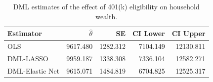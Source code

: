 \begin{table}[!htbp]
\centering
\caption{DML estimates of the effect of 401(k) eligibility on household wealth.}
\label{tab:dml-results}
\renewcommand{\arraystretch}{1.12}
\begin{tabular}{lrrrr}
 \hline
Estimator & $\hat{\theta}$ & SE & CI Lower & CI Upper \\
 \hline
OLS & 9617.480 & 1282.312 & 7104.149 & 12130.811 \\
DML-LASSO & 9959.187 & 1338.308 & 7336.104 & 12582.271 \\
DML-Elastic Net & 9615.071 & 1484.819 & 6704.825 & 12525.317 \\
 \hline
\end{tabular}
\end{table}


